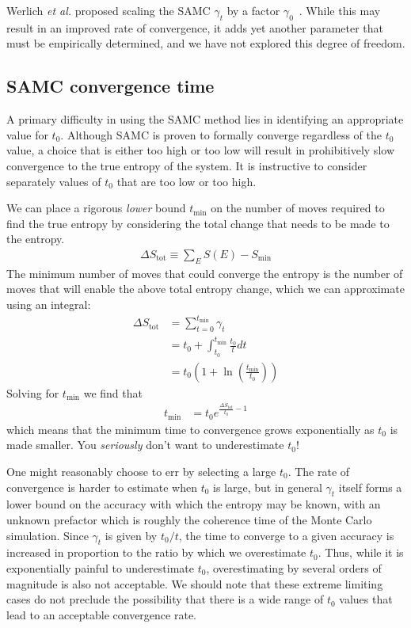 \documentclass[letterpaper,twocolumn,amsmath,amssymb,pre,aps,10pt]{revtex4-1}
\begin{document}
Werlich \emph{et al.} proposed scaling the SAMC $\gamma_t$ by a factor
$\gamma_0$~\cite{werlich2015stochastic}.  While this may result in an
improved rate of convergence, it adds yet another parameter that must
be empirically determined, and we have not explored this degree of
freedom.

\subsection{SAMC convergence time}\label{sec:samc-convergence}
A primary difficulty in using the SAMC method lies in identifying an
appropriate value for $t_0$.  Although SAMC is proven to formally
converge regardless of the $t_0$ value, a choice that is either too
high or too low will result in prohibitively slow convergence to the true
entropy of the system.  It is instructive to consider separately
values of $t_0$ that are too low or too high.

We can place a rigorous \emph{lower} bound $t_{\min}$ on the number of
moves required to find the true entropy by considering the total change
that needs to be made to the entropy.
\begin{align}
  \Delta S_{\text{tot}} \equiv \sum_E S(E) - S_{\min}
\end{align}
The minimum number of moves that could converge the entropy is
the number of moves that will enable the above total entropy change,
which we can approximate using an integral:
\begin{align}
   \Delta S_{\text{tot}} &= \sum_{t=0}^{t_{\min}} \gamma_t \\
  &= t_0 + \int_{t_0}^{t_{\min}} \frac{t_0}{t}dt
  \\
  &= t_0\left(1 + \ln\left(\frac{t_{\min}}{t_0}\right)\right)
\end{align}
Solving for ${t_{\min}}$ we find that
\begin{align}
  {t_{\min}} &= t_0 e^{\frac{\Delta S_{\text{tot}}}{t_0} - 1}
\end{align}
which means that the minimum time to convergence grows exponentially
as $t_0$ is made smaller.  You \emph{seriously} don't want to underestimate
$t_0$!

One might reasonably choose to err by selecting a large $t_0$.
The rate of convergence is harder to estimate when $t_0$ is large, but
in general $\gamma_t$ itself forms a lower bound on the accuracy with which
the entropy may be known, with an unknown prefactor which is roughly
the coherence time of the Monte Carlo simulation.  Since $\gamma_t$ is
given by $t_0/t$, the time to converge to a given accuracy is increased
in proportion to the ratio by which we overestimate $t_0$.  Thus, while
it is exponentially painful to underestimate $t_0$, overestimating by
several orders of magnitude is also not acceptable.  We should note
that these extreme limiting cases do not preclude the possibility that there
is a wide range of $t_0$ values that lead to an acceptable convergence
rate.
\end{document}
